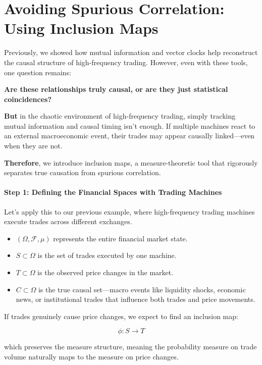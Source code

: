 
\section{Avoiding Spurious Correlation: Using Inclusion Maps}

Previously, we showed how mutual information and vector clocks help reconstruct the causal structure of high-frequency trading. However, even with these tools, one question remains: 

\textbf{Are these relationships truly causal, or are they just statistical coincidences?}  

\textbf{But} in the chaotic environment of high-frequency trading, simply tracking mutual information and causal timing isn't enough. If multiple machines react to an external macroeconomic event, their trades may appear causally linked—even when they are not.

\textbf{Therefore}, we introduce inclusion maps, a measure-theoretic tool that rigorously separates true causation from spurious correlation.

\paragraph{Step 1: Defining the Financial Spaces with Trading Machines}

Let’s apply this to our previous example, where high-frequency trading machines execute trades across different exchanges.

\begin{itemize}
    \item \( (\Omega, \mathcal{F}, \mu) \) represents the entire financial market state.
    \item \( S \subset \Omega \) is the set of trades executed by one machine.
    \item \( T \subset \Omega \) is the observed price changes in the market.
    \item \( C \subset \Omega \) is the true causal set—macro events like liquidity shocks, economic news, or institutional trades that influence both trades and price movements.
\end{itemize}

If trades genuinely cause price changes, we expect to find an inclusion map:

\[
\phi: S \to T
\]

which preserves the measure structure, meaning the probability measure on trade volume naturally maps to the measure on price changes.

